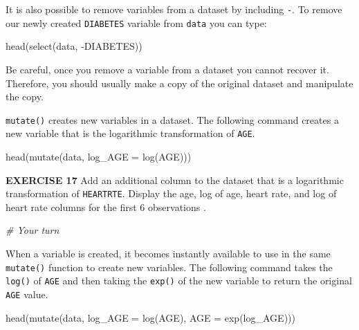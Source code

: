 \documentclass[
]{article}
\newenvironment{Shaded}{\begin{snugshade}}{\end{snugshade}}
\newcommand{\AttributeTok}[1]{\textcolor[rgb]{0.77,0.63,0.00}{#1}}
\newcommand{\CommentTok}[1]{\textcolor[rgb]{0.56,0.35,0.01}{\textit{#1}}}
\newcommand{\FunctionTok}[1]{\textcolor[rgb]{0.00,0.00,0.00}{#1}}
\newcommand{\NormalTok}[1]{#1}
\newcommand{\SpecialCharTok}[1]{\textcolor[rgb]{0.00,0.00,0.00}{#1}}
\begin{document}
It is also possible to remove variables from a dataset by including
\texttt{-}. To remove our newly created \texttt{DIABETES} variable from
\texttt{data} you can type:

\begin{Shaded}
\begin{Highlighting}[]
\FunctionTok{head}\NormalTok{(}\FunctionTok{select}\NormalTok{(data, }\SpecialCharTok{{-}}\NormalTok{DIABETES))}
\end{Highlighting}
\end{Shaded}

Be careful, once you remove a variable from a dataset you cannot recover
it. Therefore, you should usually make a copy of the original dataset
and manipulate the copy.

\texttt{mutate()} creates new variables in a dataset. The following
command creates a new variable that is the logarithmic transformation of
\texttt{AGE}.

\begin{Shaded}
\begin{Highlighting}[]
\FunctionTok{head}\NormalTok{(}\FunctionTok{mutate}\NormalTok{(data, }\AttributeTok{log\_AGE =} \FunctionTok{log}\NormalTok{(AGE)))}
\end{Highlighting}
\end{Shaded}

\textbf{EXERCISE 17} Add an additional column to the dataset that is a
logarithmic transformation of \texttt{HEARTRTE}. Display the age, log of
age, heart rate, and log of heart rate columns for the first 6
observations .

\begin{Shaded}
\begin{Highlighting}[]
\CommentTok{\# Your turn}
\end{Highlighting}
\end{Shaded}

When a variable is created, it becomes instantly available to use in the
same \texttt{mutate()} function to create new variables. The following
command takes the \texttt{log()} of \texttt{AGE} and then taking the
\texttt{exp()} of the new variable to return the original \texttt{AGE}
value.

\begin{Shaded}
\begin{Highlighting}[]
\FunctionTok{head}\NormalTok{(}\FunctionTok{mutate}\NormalTok{(data, }\AttributeTok{log\_AGE =} \FunctionTok{log}\NormalTok{(AGE), }\AttributeTok{AGE =} \FunctionTok{exp}\NormalTok{(log\_AGE)))}
\end{Highlighting}
\end{Shaded}
\end{document}
